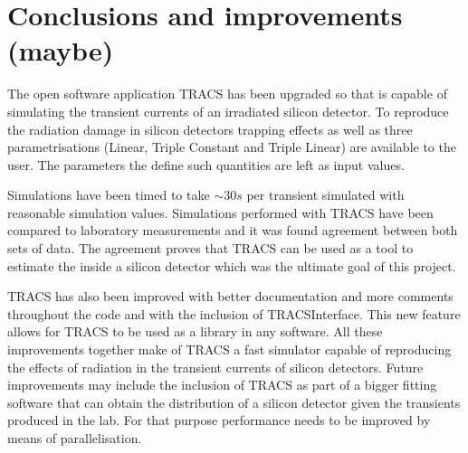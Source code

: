 \chapter{Conclusions and improvements (maybe)}

The open software application TRACS has been upgraded so that is capable of simulating the transient currents of an irradiated silicon detector. To reproduce the radiation damage in silicon detectors trapping effects as well as three \neff parametrisations (Linear, Triple Constant and Triple Linear) are available to the user. The parameters the define such quantities are left as input values.

Simulations have been timed to take $\sim 30s$ per transient simulated with reasonable simulation values. Simulations performed with TRACS have been compared to laboratory measurements and it was found agreement between both sets of data. The agreement proves that TRACS can be used as a tool to estimate the \neff inside a silicon detector which was the ultimate goal of this project.

TRACS has also been improved with better documentation and more comments throughout the code and with the inclusion of TRACSInterface. This new feature allows for TRACS to be used as a library in any software.  All these improvements together make of TRACS a fast simulator capable of reproducing the effects of radiation in the transient currents of silicon detectors. Future improvements may include the inclusion of TRACS as part of a bigger fitting software that can obtain the \neff distribution of a silicon detector given the transients produced in the lab. For that purpose performance needs to be improved by means of parallelisation.


